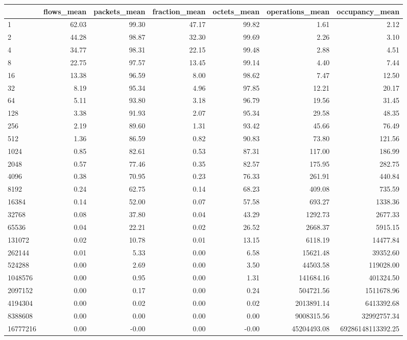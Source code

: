 \begin{tabular}{lrrrrrr}
\toprule
 & flows_mean & packets_mean & fraction_mean & octets_mean & operations_mean & occupancy_mean \\
\midrule
1 & 62.03 & 99.30 & 47.17 & 99.82 & 1.61 & 2.12 \\
2 & 44.28 & 98.87 & 32.30 & 99.69 & 2.26 & 3.10 \\
4 & 34.77 & 98.31 & 22.15 & 99.48 & 2.88 & 4.51 \\
8 & 22.75 & 97.57 & 13.45 & 99.14 & 4.40 & 7.44 \\
16 & 13.38 & 96.59 & 8.00 & 98.62 & 7.47 & 12.50 \\
32 & 8.19 & 95.34 & 4.96 & 97.85 & 12.21 & 20.17 \\
64 & 5.11 & 93.80 & 3.18 & 96.79 & 19.56 & 31.45 \\
128 & 3.38 & 91.93 & 2.07 & 95.34 & 29.58 & 48.35 \\
256 & 2.19 & 89.60 & 1.31 & 93.42 & 45.66 & 76.49 \\
512 & 1.36 & 86.59 & 0.82 & 90.83 & 73.80 & 121.56 \\
1024 & 0.85 & 82.61 & 0.53 & 87.31 & 117.00 & 186.99 \\
2048 & 0.57 & 77.46 & 0.35 & 82.57 & 175.95 & 282.75 \\
4096 & 0.38 & 70.95 & 0.23 & 76.33 & 261.91 & 440.84 \\
8192 & 0.24 & 62.75 & 0.14 & 68.23 & 409.08 & 735.59 \\
16384 & 0.14 & 52.00 & 0.07 & 57.58 & 693.27 & 1338.36 \\
32768 & 0.08 & 37.80 & 0.04 & 43.29 & 1292.73 & 2677.33 \\
65536 & 0.04 & 22.21 & 0.02 & 26.52 & 2668.37 & 5915.15 \\
131072 & 0.02 & 10.78 & 0.01 & 13.15 & 6118.19 & 14477.84 \\
262144 & 0.01 & 5.33 & 0.00 & 6.58 & 15621.48 & 39352.60 \\
524288 & 0.00 & 2.69 & 0.00 & 3.50 & 44503.58 & 119028.00 \\
1048576 & 0.00 & 0.95 & 0.00 & 1.31 & 141684.16 & 401324.50 \\
2097152 & 0.00 & 0.17 & 0.00 & 0.24 & 504721.56 & 1511678.96 \\
4194304 & 0.00 & 0.02 & 0.00 & 0.02 & 2013891.14 & 6413392.68 \\
8388608 & 0.00 & 0.00 & 0.00 & 0.00 & 9008315.56 & 32992757.34 \\
16777216 & 0.00 & -0.00 & 0.00 & -0.00 & 45204493.08 & 69286148113392.25 \\
\bottomrule
\end{tabular}
